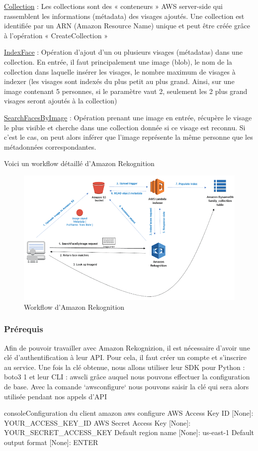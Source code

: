 \underline{Collection} : Les collections sont des « conteneurs » AWS server-side qui rassemblent les informations (métadata)
des visages ajoutés. Une collection est identifiée par un ARN (Amazon Resource Name) unique et peut être créée
grâce à l’opération « CreateCollection »

\underline{IndexFace} : Opération d’ajout d’un ou plusieurs visages (métadatas) dans une collection. En entrée, il faut
principalement une image (blob), le nom de la collection dans laquelle insérer les visages, le nombre maximum de
visages à indexer (les visages sont indexés du plus petit au plus grand. Ainsi, sur une image contenant 5 personnes,
si le paramètre vaut 2, seulement les 2 plus grand visages seront ajoutés à la collection)

\underline{SearchFacesByImage} : Opération prenant une image en entrée, récupère le visage le plus visible et cherche dans
une collection donnée si ce visage est reconnu. Si c’est le cas, on peut alors inférer que l’image représente la même
personne que les métadonnées correspondantes.

Voici un workflow détaillé d’Amazon Rekognition

\begin{figure}[H]
	\centering
	\includegraphics[width=12cm]{images/proto-6.png}
	\caption{Workflow d'Amazon Rekognition}
	\label{fig:reko-workflow}
\end{figure}

\subsubsection{Prérequis}

Afin de pouvoir travailler avec Amazon Rekognizion, il est nécessaire d’avoir une clé d’authentification à leur API.
Pour cela, il faut créer un compte et s’inscrire au service. Une fois la clé obtenue, nous allons utiliser leur SDK pour
Python : boto3 1 et leur CLI : awscli grâce auquel nous pouvons effectuer la configuration de base.
Avec la comande `awsconfigure` nous pouvons saisir la clé qui sera alors utilisée pendant nos appels d’API

\begin{listingsbox}{console}{Configuration du client amazon}
aws configure
AWS Access Key ID [None]:  YOUR_ACCESS_KEY_ID
AWS Secret Access Key [None]: YOUR_SECRET_ACCESS_KEY
Default region name [None]: us-east-1
Default output format [None]: ENTER
\end{listingsbox}